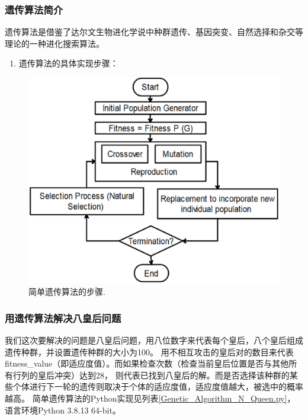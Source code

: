 \documentclass[12pt,a4paper,UTF8]{ctexart}
\begin{document}
\subsubsection{遗传算法简介}
遗传算法是借鉴了达尔文生物进化学说中种群遗传、基因突变、自然选择和杂交等理论的一种进化搜索算法。
\begin{enumerate}
    \item 遗传算法的具体实现步骤：
\end{enumerate}
\begin{figure}[htbp]
    \centering
    \includegraphics[width=12cm]{allpicture/alsxf-vpg1i.eps}
    \caption{简单遗传算法的步骤\cite{pandeyGeneticAlgorithmsConcepts2012}.}
    \label{fig:遗传算法的步骤}
\end{figure}
\subsubsection{用遗传算法解决八皇后问题}
我们这次要解决的问题是八皇后问题，用八位数字来代表每个皇后，八个皇后组成遗传种群，并设置遗传种群的大小为100。
用不相互攻击的皇后对的数目来代表fitness\_value（即适应度值）。而如果检查次数（检查当前皇后位置是否与其他所有行列的皇后冲突）达到28，
则代表已找到八皇后的解。而是否选择该种群的某些个体进行下一轮的遗传则取决于个体的适应度值，适应度值越大，被选中的概率越高。
简单遗传算法的Python实现见列表\ref{Genetic_Algorithm_N_Queen.py}，语言环境Python 3.8.13 64-bit。

\end{document}
